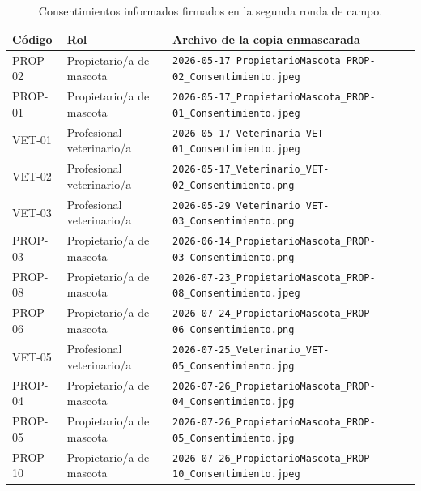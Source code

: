 \documentclass[journal,onecolumn]{IEEEtran}
\begin{document}
	\begin{table}[H]
		\centering
		\caption{Consentimientos informados firmados en la segunda ronda de campo.}
		\label{tab:consentimientos}
		\small
		\begin{tabularx}{\textwidth}{@{}l l X@{}}
			\toprule
			\textbf{Código} & \textbf{Rol} & \textbf{Archivo de la copia enmascarada} \\
			\midrule
			
			PROP-02 & Propietario/a de mascota & \texttt{2026-05-17\_PropietarioMascota\_PROP-02\_Consentimiento.jpeg} \\
			
			PROP-01 & Propietario/a de mascota & \texttt{2026-05-17\_PropietarioMascota\_PROP-01\_Consentimiento.jpeg} \\
			
			VET-01 & Profesional veterinario/a & \texttt{2026-05-17\_Veterinaria\_VET-01\_Consentimiento.jpeg} \\
			
			VET-02 & Profesional veterinario/a & \texttt{2026-05-17\_Veterinario\_VET-02\_Consentimiento.png} \\
			
			VET-03 & Profesional veterinario/a & \texttt{2026-05-29\_Veterinario\_VET-03\_Consentimiento.png} \\
			
			PROP-03 & Propietario/a de mascota & \texttt{2026-06-14\_PropietarioMascota\_PROP-03\_Consentimiento.png} \\
			
			PROP-08 & Propietario/a de mascota & \texttt{2026-07-23\_PropietarioMascota\_PROP-08\_Consentimiento.jpeg} \\
			
			PROP-06 & Propietario/a de mascota & \texttt{2026-07-24\_PropietarioMascota\_PROP-06\_Consentimiento.png} \\
			
			VET-05 & Profesional veterinario/a & \texttt{2026-07-25\_Veterinario\_VET-05\_Consentimiento.jpg} \\
			
			PROP-04 & Propietario/a de mascota & \texttt{2026-07-26\_PropietarioMascota\_PROP-04\_Consentimiento.jpg} \\
			
			PROP-05 & Propietario/a de mascota & \texttt{2026-07-26\_PropietarioMascota\_PROP-05\_Consentimiento.jpg} \\
			
			PROP-10 & Propietario/a de mascota & \texttt{2026-07-26\_PropietarioMascota\_PROP-10\_Consentimiento.jpeg} \\
			

\end{tabularx}
\end{table}
\end{document}
